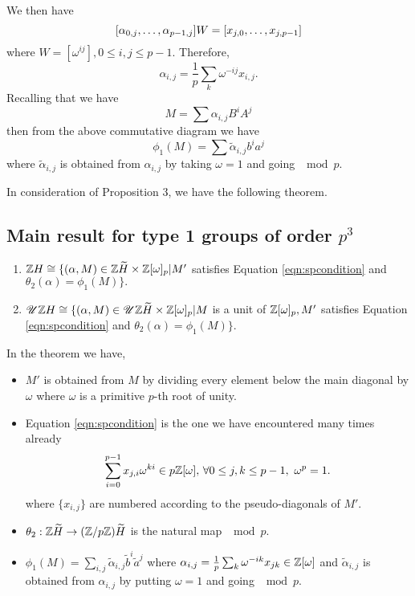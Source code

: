 \documentclass[11pt]{report}
\begin{document}
We then have
\[[\series[\alpha]{0,j}{p-1,j}] W = [\series{j,0}{j,p-1}]\]
where $W=[\omega{}^{ij}], 0\le{}i,j\le{}p-1$. Therefore,
\[\alpha_{i,j} = \frac{1}{p}\sum_{k}\omega^{-ij}x_{i,j}.\]
Recalling that we have
\[M = \sum \alpha_{i,j}B^{i}A^{j}\]
then from the above commutative diagram we have
\[\phi_{1}(M) = \sum\tilde{\alpha}_{i,j}b^{i}a^{j}\]
where $\tilde{\alpha}_{i,j}$  is obtained from $\alpha_{i,j}$ by taking
$\omega = 1$ and going $\mod{p}$.

In consideration of Proposition 3, we have the following theorem.

\subsection{Main result for type 1 groups of order $p^3$}

\begin{theorem}
\begin{enumerate}
\item{}$\integers{}H\cong \{(\alpha,M) \in \integers\widetilde{H} 
\times \integers{}[\omega{}]_p \vert M'$ satisfies Equation \ref{eqn:spcondition} and 
$\theta_2(\alpha) = \phi_1(M)\}.$
\item{}$\mathscr{U}\integers{}H\cong \{(\alpha,M) \in 
\mathscr{U}\integers\widetilde{H} 
\times \integers{}[\omega{}]_p \vert M$ is a unit of $\integers{}[\omega{}]_p, M'$
 satisfies Equation \ref{eqn:spcondition} and 
$\theta_2(\alpha) = \phi_1(M)\}.$
\end{enumerate}
\end{theorem}

In the theorem we have,
\begin{itemize}
\item{} $M'$ is obtained from $M$ by dividing every element below the main diagonal by $\omega$
where $\omega$ is a
primitive $p$-th root of unity.
\item{} Equation  \ref{eqn:spcondition} is the one we have encountered many times already
\[\spcondition
\]
where $\{x_{i,j}\}$ are numbered according to the pseudo-diagonals of $M'$.
\item{}  $\theta_2:\integers\widetilde{H} \rightarrow (\integers/p\integers)
\widetilde{H}$ is  the natural map $\mod{p}$.
\item{}$\phi_1(M) =\sum_{i,j}\tilde{\alpha}_{i,j}\tilde{b}^i\tilde{a}^j$
 where $\alpha_{i,j} = \frac{1}{p}\sum_k\omega^{-ik}x_{jk} 
\in \integers{}[\omega{}]$ and $\tilde{\alpha}_{i,j}$ is
obtained from $\alpha_{i,j}$ by
putting $\omega = 1$ and going $\mod{p}$.
\end{itemize}
\end{document}

